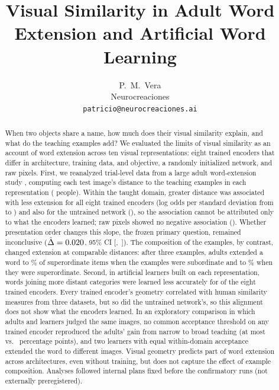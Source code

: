 \documentclass[11pt]{article}
\title{Visual Similarity in Adult Word Extension and Artificial Word Learning}
\author{
P.~M.~Vera\\
Neurocreaciones\\
\texttt{patricio@neurocreaciones.ai}
}
\date{}
\begin{document}
\maketitle
\vspace{-1.0em}

\begin{abstract}
When two objects share a name, how much does their visual similarity explain, and what do the teaching examples add? We evaluated the limits of visual similarity as an account of word extension across ten visual representations: eight trained encoders that differ in architecture, training data, and objective, a randomly initialized network, and raw pixels. First, we reanalyzed trial-level data from a large adult word-extension study \parencite{lewis2018}, computing each test image's distance to the teaching examples in each representation (\VtPersons{} people). Within the taught domain, greater distance was associated with less extension for all eight trained encoders (log odds per standard deviation from \VtPcViTB{} to \VtPcMaeB) and also for the untrained network (\VtPcRandB), so the association cannot be attributed only to what the encoders learned; raw pixels showed no negative association (\VtPcPixB). Whether presentation order changes this slope, the frozen primary question, remained inconclusive ($\hat\Delta = 0.020$, 95\% CI [\VtOrdLo,~\VtOrdHi]). The composition of the examples, by contrast, changed extension at comparable distances: after three examples, adults extended a word to \SelSubSup\% of superordinate items when the examples were subordinate and to \SelSupSup\% when they were superordinate. Second, in artificial learners built on each representation, words joining more distant categories were learned less accurately for \VtDSupportWord{} of the eight trained encoders. Every trained encoder's geometry correlated with human similarity measures from three datasets, but so did the untrained network's, so this alignment does not show what the encoders learned. In an exploratory comparison in which adults and learners judged the same images, no common acceptance threshold on any trained encoder reproduced the adults' gain from narrow to broad teaching (at most \VtXJumpMax{} vs.\ \VtXJumpAdult{} percentage points), and two learners with equal within-domain acceptance extended the word to different images. Visual geometry predicts part of word extension across architectures, even without training, but does not capture the effect of example composition. Analyses followed internal plans fixed before the confirmatory runs (not externally preregistered).
\end{abstract}
\end{document}
